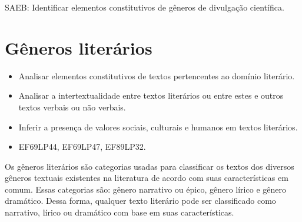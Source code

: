 SAEB: Identificar elementos constitutivos de gêneros de divulgação
científica.

\chapter{Gêneros literários}


\begin{itemize}
  \item
Analisar elementos constitutivos de
textos pertencentes ao domínio literário.
\item Analisar a intertextualidade
entre textos literários ou entre estes e outros textos verbais ou não
verbais.
\item Inferir a presença de valores sociais, culturais e humanos em
textos literários.
\end{itemize}


\begin{itemize}
\tightlist
\item
  EF69LP44, EF69LP47, EF89LP32.
\end{itemize}

Os gêneros literários são categorias usadas para classificar os textos
dos diversos gêneros textuais existentes na literatura de acordo com
suas características em comum. Essas categorias são: gênero narrativo ou
épico, gênero lírico e gênero dramático. Dessa forma, qualquer texto
literário pode ser classificado como narrativo, lírico ou dramático com
base em suas características.

